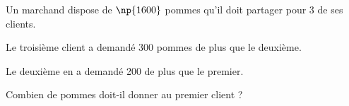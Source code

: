 %
%
    Un marchand dispose de $\np{1600}$ pommes qu'il doit partager pour 3 de ses clients.

    Le troisième client a demandé 300 pommes de plus que le deuxième.

    Le deuxième en a demandé 200 de plus que le premier.

    Combien de pommes doit-il donner au premier client ?
